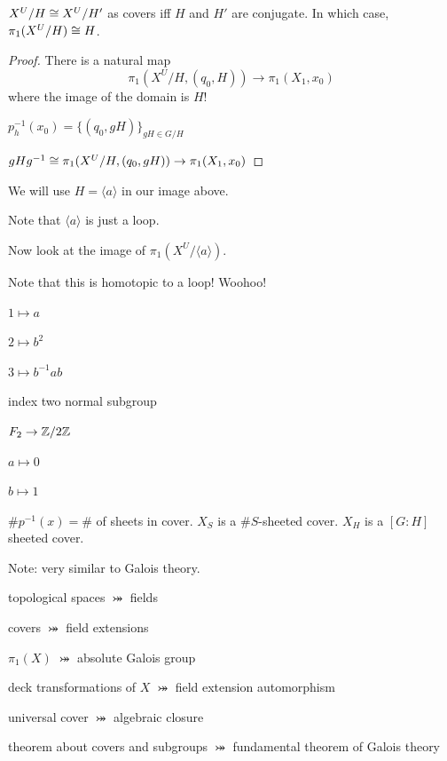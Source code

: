 \documentclass[11pt,leqno,oneside]{amsart}
\numberwithin{thm}{section}
\newcommand{\fund}[1][1]{\pi_{#1}}
\begin{document}
\begin{thm}
  $X^U/H \mathrel{\cong} X^U/H'$ as covers iff $H$ and $H'$ are conjugate.  In which case, $\fund[1](X^U/H) \isom H$.
\end{thm}
\begin{proof}
  There is a natural map $$\fund[1](X^U/H, (q_0, H)) \to \fund(X_1, x_0)$$ where the image of the domain is $H$!

  $p_h^{-1}(x_0) = \{ (q_0, gH) \}_{gH \in G/H}$

  $gHg^{-1} \isom \fund(X^U/H, (q_0, gH) ) \to \fund(X_1, x_0)$

\end{proof}
\begin{example}
  We will use $H =  \langle a \rangle $ in our image above.

  Note that $ \langle a \rangle $ is just a loop.

  Now look at the image of $\fund(X^U/ \langle a \rangle )$.


  Note that this is homotopic to a loop!  Woohoo!
\end{example}
\begin{example}

  $1 \mapsto a$

  $2 \mapsto b^2$

  $3 \mapsto b^{-1} a b$

  index two normal subgroup

  $F_2 \to {\mathbb Z}/2{\mathbb Z}$

  $a \mapsto 0$

  $b \mapsto 1$
\end{example}


$\#p^{-1}(x) = \#$ of sheets in cover.  $X_S$ is a $\#S$-sheeted cover.  $X_H$ is a $[G:H]$ sheeted cover.

Note: very similar to Galois theory.

topological spaces $\bij$ fields

covers $\bij$ field extensions

$\fund(X)$ $\bij$ absolute Galois group

deck transformations of $X$ $\bij$ field extension automorphism

universal cover $\bij$ algebraic closure

theorem about covers and subgroups $\bij$ fundamental theorem of Galois theory
\end{document}
